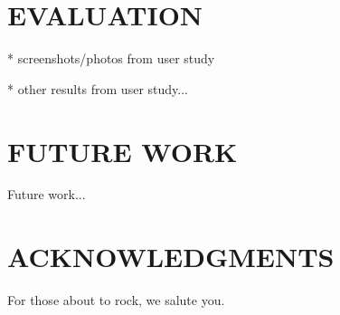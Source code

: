 \documentclass{article}
\begin{document}
\section{EVALUATION}

* screenshots/photos from user study

* other results from user study...

\section{FUTURE WORK}

Future work...

\section{ACKNOWLEDGMENTS}


For those about to rock, we salute you.



\end{document}
